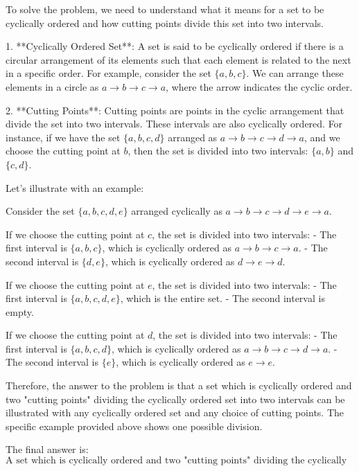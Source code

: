 To solve the problem, we need to understand what it means for a set to be cyclically ordered and how cutting points divide this set into two intervals.

1. **Cyclically Ordered Set**: A set is said to be cyclically ordered if there is a circular arrangement of its elements such that each element is related to the next in a specific order. For example, consider the set \(\{a, b, c\}\). We can arrange these elements in a circle as \(a \rightarrow b \rightarrow c \rightarrow a\), where the arrow indicates the cyclic order.

2. **Cutting Points**: Cutting points are points in the cyclic arrangement that divide the set into two intervals. These intervals are also cyclically ordered. For instance, if we have the set \(\{a, b, c, d\}\) arranged as \(a \rightarrow b \rightarrow c \rightarrow d \rightarrow a\), and we choose the cutting point at \(b\), then the set is divided into two intervals: \(\{a, b\}\) and \(\{c, d\}\).

Let's illustrate with an example:

Consider the set \(\{a, b, c, d, e\}\) arranged cyclically as \(a \rightarrow b \rightarrow c \rightarrow d \rightarrow e \rightarrow a\).

If we choose the cutting point at \(c\), the set is divided into two intervals:
- The first interval is \(\{a, b, c\}\), which is cyclically ordered as \(a \rightarrow b \rightarrow c \rightarrow a\).
- The second interval is \(\{d, e\}\), which is cyclically ordered as \(d \rightarrow e \rightarrow d\).

If we choose the cutting point at \(e\), the set is divided into two intervals:
- The first interval is \(\{a, b, c, d, e\}\), which is the entire set.
- The second interval is empty.

If we choose the cutting point at \(d\), the set is divided into two intervals:
- The first interval is \(\{a, b, c, d\}\), which is cyclically ordered as \(a \rightarrow b \rightarrow c \rightarrow d \rightarrow a\).
- The second interval is \(\{e\}\), which is cyclically ordered as \(e \rightarrow e\).

Therefore, the answer to the problem is that a set which is cyclically ordered and two "cutting points" dividing the cyclically ordered set into two intervals can be illustrated with any cyclically ordered set and any choice of cutting points. The specific example provided above shows one possible division.

The final answer is:
\[
\boxed{\text{A set which is cyclically ordered and two "cutting points" dividing the cyclically ordered set into two intervals}}
\]